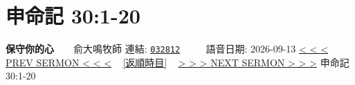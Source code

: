 \documentclass{book}
\begin{document}
\section{申命記 30:1-20}
\label{sec:032812}
\textbf{保守你的心}~~~~俞大鳴牧師
\newline
\newline
連結: \href{http://www.church.com.hk/acms/content.asp?site=cdc\&op=show\&type=product\&code=032812\&layout=sermon}{\texttt{032812}} ~~~~ 語音日期: 2026-09-13
\newline
\newline
\hyperref[sec:032811]{\small{< < < PREV SERMON < < <}}
~
\hyperref[sec:index_chronic]{\small{[返順時目]}}
~
\hyperref[sec:032813]{\small{> > > NEXT SERMON > > >}}
\newline
\newline
申命記 30:1-20
\newline
\end{document}
